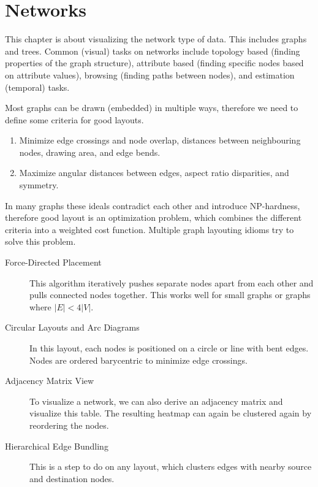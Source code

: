 \chapter{Networks}
This chapter is about visualizing the network type of data.
This includes graphs and trees.
Common (visual) tasks on networks include topology based (finding properties of the graph structure), attribute based (finding specific nodes based on attribute values), browsing (finding paths between nodes), and estimation (temporal) tasks.

Most graphs can be drawn (embedded) in multiple ways, therefore we need to define some criteria for good layouts.

\begin{enumerate}
    \item Minimize edge crossings and node overlap, distances between neighbouring nodes, drawing area, and edge bends.
    \item Maximize angular distances between edges, aspect ratio disparities, and symmetry.
\end{enumerate}

In many graphs these ideals contradict each other and introduce NP-hardness, therefore good layout is an optimization problem, which combines the different criteria into a weighted cost function.
Multiple graph layouting idioms try to solve this problem.

\begin{description}
    \item[Force-Directed Placement] This algorithm iteratively pushes separate nodes apart from each other and pulls connected nodes together.
        This works well for small graphs or graphs where \(|E| < 4|V|\).

    \item[Circular Layouts and Arc Diagrams] In this layout, each nodes is positioned on a circle or line with bent edges.
        Nodes are ordered barycentric to minimize edge crossings.

    \item[Adjacency Matrix View] To visualize a network, we can also derive an adjacency matrix and visualize this table.
        The resulting heatmap can again be clustered again by reordering the nodes.

    \item[Hierarchical Edge Bundling] This is a step to do on any layout, which clusters edges with nearby source and destination nodes.
\end{description}

